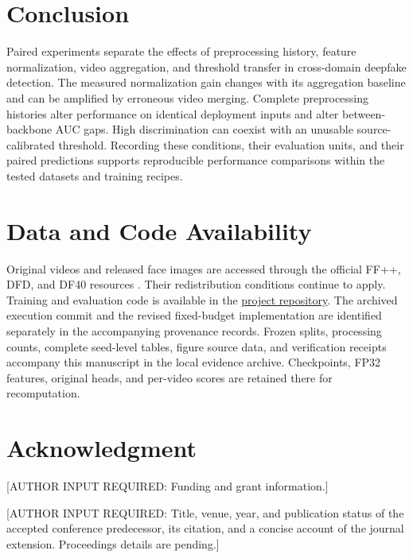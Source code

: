 \documentclass{ieeeaccess}
\begin{document}
\section{Conclusion}\label{conclusion}

Paired experiments separate the effects of preprocessing history,
feature normalization, video aggregation, and threshold transfer in
cross-domain deepfake detection. The measured normalization gain changes
with its aggregation baseline and can be amplified by erroneous video
merging. Complete preprocessing histories alter performance on identical
deployment inputs and alter between-backbone AUC gaps. High
discrimination can coexist with an unusable source-calibrated threshold.
Recording these conditions, their evaluation units, and their paired
predictions supports reproducible performance comparisons within the
tested datasets and training recipes.

\section*{Data and Code Availability}\label{data-and-code-availability}

Original videos and released face images are accessed through the
official FF++, DFD, and DF40 resources \citep{ffdata, df40code}. Their
redistribution conditions continue to apply. Training and evaluation
code is available in the
\href{https://github.com/xiaotubaobiu/Disentangling-Angular-Norm-Deepfake-Detection}{project
repository}. The archived execution commit and the revised fixed-budget
implementation are identified separately in the accompanying provenance
records. Frozen splits, processing counts, complete seed-level tables,
figure source data, and verification receipts accompany this manuscript
in the local evidence archive. Checkpoints, FP32 features, original
heads, and per-video scores are retained there for recomputation.

\section*{Acknowledgment}\label{acknowledgment}

{[}AUTHOR INPUT REQUIRED: Funding and grant information.{]}

{[}AUTHOR INPUT REQUIRED: Title, venue, year, and publication status of
the accepted conference predecessor, its citation, and a concise account
of the journal extension. Proceedings details are pending.{]}
\end{document}
